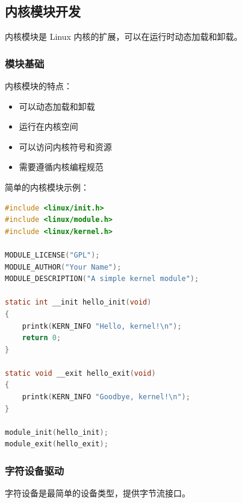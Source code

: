 \subsection{内核模块开发}

内核模块是 Linux 内核的扩展，可以在运行时动态加载和卸载。

\subsubsection{模块基础}


内核模块的特点：
\begin{itemize}
  \item 可以动态加载和卸载
  \item 运行在内核空间
  \item 可以访问内核符号和资源
  \item 需要遵循内核编程规范
\end{itemize}

简单的内核模块示例：
\begin{lstlisting}[language=C]
#include <linux/init.h>
#include <linux/module.h>
#include <linux/kernel.h>

MODULE_LICENSE("GPL");
MODULE_AUTHOR("Your Name");
MODULE_DESCRIPTION("A simple kernel module");

static int __init hello_init(void)
{
    printk(KERN_INFO "Hello, kernel!\n");
    return 0;
}

static void __exit hello_exit(void)
{
    printk(KERN_INFO "Goodbye, kernel!\n");
}

module_init(hello_init);
module_exit(hello_exit);
\end{lstlisting}

\subsubsection{字符设备驱动}

字符设备是最简单的设备类型，提供字节流接口。


